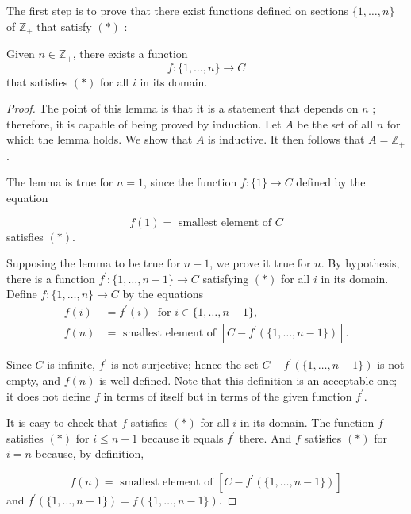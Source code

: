 The first step is to prove that there exist functions defined on sections 
\(\{1,\ldots, n\}\) of \(\mathbb{Z}_{+}\) that satisfy \((*)\) :

\begin{lemma}
\label{lem:\thetheorem}
 Given \(n \in {\mathbb{Z}}_{+}\), there exists a function
 \[
 f : \{1,\ldots, n\} \rightarrow C
 \]
 that satisfies \((*)\) for all \(i\) in its domain.
\end{lemma}

\begin{proof}
 The point of this lemma is that it is a statement that depends on \(n\) ; therefore, it is capable of being proved by induction. Let \(A\) be the set of all \(n\) for which the lemma holds. We show that \(A\) is inductive. It then follows that \(A = \mathbb{Z}_{+}\).

 The lemma is true for \(n = 1\), since the function \(f : \{1\} \rightarrow C\) defined by the equation

 \[
 f(1) = \text{ smallest element of }C
 \]
 satisfies \((*)\).

 Supposing the lemma to be true for \(n - 1\), we prove it true for \(n\). By hypothesis, there is a function \(f^{\prime } : \{1,\ldots, n - 1\} \rightarrow C\) satisfying \((*)\) for all \(i\) in its domain. Define \(f : \{1,\ldots, n\} \rightarrow C\) by the equations
 \[
 \begin{aligned}
 f(i) &= f^{\prime }(i) \;\text{ for }i \in \{1,\ldots, n - 1\}, \\
 f(n) &= \text{ smallest element of }[{C - f^{\prime }({\{1,\ldots, n - 1\} }) }] .
 \end{aligned}
 \]

 Since \(C\) is infinite, \(f^{\prime }\) is not surjective; hence the set \(C - f^{\prime }({\{1,\ldots, n - 1\} })\) is not empty, and \(f(n)\) is well defined. Note that this definition is an acceptable one; it does not define \(f\) in terms of itself but in terms of the given function \(f^{\prime }\).

 It is easy to check that \(f\) satisfies \((*)\) for all \(i\) in its domain. The function \(f\) satisfies \((*)\) for \(i \leq n - 1\) because it equals \(f^{\prime }\) there. And \(f\) satisfies \((*)\) for \(i = n\) because, by definition,

 \[
 f(n) = \text{ smallest element of }[{C - f^{\prime }({\{1,\ldots, n - 1\} }) }]
 \]
 and \(f^{\prime }({\{1,\ldots, n - 1\} }) = f({\{1,\ldots, n - 1\} })\).
\end{proof}

